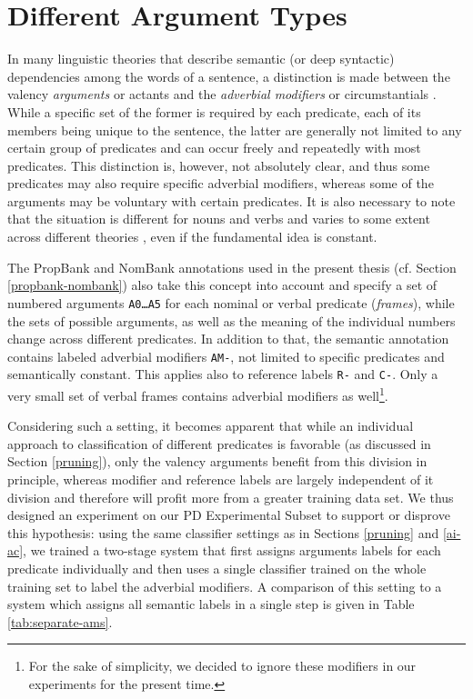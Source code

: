 \documentclass[12pt,notitlepage]{report}
\begin{document}
\section{Different Argument Types}\label{arg-types}

In many linguistic theories that describe semantic (or deep syntactic) dependencies among the words of a sentence, a distinction is made between the valency \emph{arguments} or actants and the \emph{adverbial modifiers} or circumstantials \citep[p. 100ff.]{sgall86}. While a specific set of the former is required by each predicate, each of its members being unique to the sentence, the latter are generally not limited to any certain group of predicates and can occur freely and repeatedly with most predicates. This distinction is, however, not absolutely clear, and thus some predicates may also require specific adverbial modifiers, whereas some of the arguments may be voluntary with certain predicates. It is also necessary to note that the situation is different for nouns and verbs and varies to some extent across different theories \citep{rambow03}, even if the fundamental idea is constant.

The PropBank \citep{kingsbury02,palmer05} and NomBank \citep{meyers04} annotations used in the present thesis (cf. Section \ref{propbank-nombank}) also take this concept into account and specify a set of numbered arguments \texttt{A0\dots A5} for each nominal or verbal predicate (\emph{frames}), while the sets of possible arguments, as well as the meaning of the individual numbers change across different predicates. In addition to that, the semantic annotation contains labeled adverbial modifiers \texttt{AM-}, not limited to specific predicates and semantically constant. This applies also to reference labels \texttt{R-} and \texttt{C-}. Only a very small set of verbal frames contains adverbial modifiers as well\footnote{For the sake of simplicity, we decided to ignore these modifiers in our experiments for the present time.}.

Considering such a setting, it becomes apparent that while an individual approach to classification of different predicates is favorable (as discussed in Section \ref{pruning}), only the valency arguments benefit from this division in principle, whereas modifier and reference labels are largely independent of it division and therefore will profit more from a greater training data set. We thus designed an experiment on our PD Experimental Subset to support or disprove this hypothesis: using the same classifier settings as in Sections \ref{pruning} and \ref{ai-ac}, we trained a two-stage system that first assigns arguments labels for each predicate individually and then uses a single classifier trained on the whole training set to label the adverbial modifiers. A comparison of this setting to a system which assigns all semantic labels in a single step is given in Table \ref{tab:separate-ams}.
\end{document}
